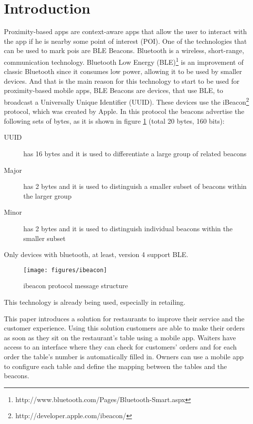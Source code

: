
\section{Introduction}
\label{sec:introduction}
Proximity-based apps are
context-aware apps that allow the user to interact
with the app if he is nearby some point of interest (POI).
One of the technologies that can be used to mark pois are BLE Beacons.
Bluetooth is a wireless, short-range, communication technology.
Bluetooth Low Energy (BLE)\footnote{http://www.bluetooth.com/Pages/Bluetooth-Smart.aspx}
is an improvement of classic Bluetooth since it consumes
low power, allowing it to be used by smaller devices.
And that is the main reason for this technology to start to
be used for proximity-based mobile apps,
BLE Beacons are devices, that use BLE, to broadcast a
Universally Unique Identifier (UUID).
These devices use the
iBeacon\footnote{http://developer.apple.com/ibeacon/}
protocol, which was created
by Apple\texttrademark. In this protocol the beacons
advertise the following sets of bytes, as it is shown in
figure \ref{fig:ibeacon}
(total 20 bytes, 160 bits):
\begin{description}
  \item[UUID] has 16 bytes and it is used to differentiate a
  large group of related beacons
  \item[Major] has 2 bytes and it is used to distinguish a smaller
  subset of beacons within the larger group
  \item[Minor] has 2 bytes and it is used to distinguish individual
  beacons within the smaller subset
\end{description}
Only devices with bluetooth, at least, version 4 support BLE.

\begin{figure}[!ht]
  \centering
    \texttt{[image: figures/ibeacon]}
    \caption{ibeacon protocol message structure}
    \label{fig:ibeacon}
\end{figure}


This technology is already being used, especially in retailing.

This paper introduces a solution for restaurants to improve their
service and the customer experience. Using this solution customers
are able to make their orders as soon as they sit on
the restaurant's table using a mobile app.
Waiters have access to an interface where they can check for customers'
orders and for each order the table's number is automatically filled in.
Owners can use a mobile app to configure each table and define the
mapping between the tables
and the beacons.

